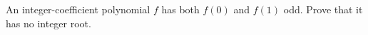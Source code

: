 An integer-coefficient polynomial $f$ has both $f(0)$ and $f(1)$ odd. Prove that it has no integer root.
